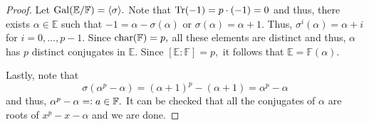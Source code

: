 \artinschreiercor*\label{cor:artinschreiercor2}
\begin{flushright}\hyperref[cor:artinschreiercor]{\upsym}\end{flushright}
\begin{proof}
    Let $\operatorname{Gal}(\mathbb{E}/\mathbb{F}) = \langle \sigma\rangle.$ Note that $\operatorname{Tr}(-1) = p \cdot (-1) = 0$ and thus, there exists $\alpha \in \mathbb{E}$ such that $-1 = \alpha - \sigma(\alpha)$ or $\sigma(\alpha) = \alpha + 1.$ Thus, $\sigma^i(\alpha) = \alpha + i$ for $i = 0, \ldots, p - 1.$ Since $\operatorname{char}(\mathbb{F}) = p,$ all these elements are distinct and thus, $\alpha$ has $p$ distinct conjugates in $\mathbb{E}.$ Since $[\mathbb{E} : \mathbb{F}] = p,$ it follows that $\mathbb{E} = \mathbb{F}(\alpha).$ 

    Lastly, note that
    \begin{equation*} 
        \sigma(\alpha^p - \alpha) = (\alpha + 1)^p - (\alpha + 1) = \alpha^p - \alpha
    \end{equation*}
    and thus, $\alpha^p - \alpha =\vcentcolon a \in \mathbb{F}.$ It can be checked that all the conjugates of $\alpha$ are roots of $x^p - x - \alpha$ and we are done.
\end{proof} 